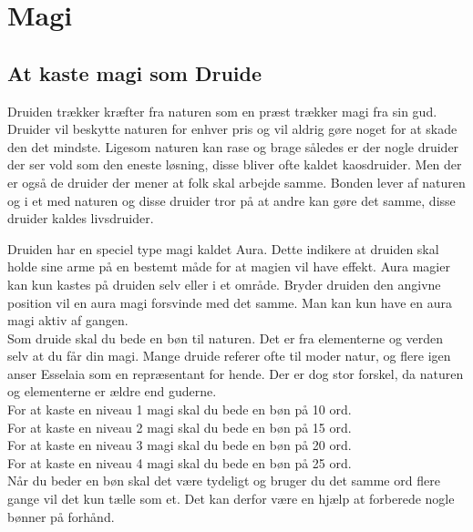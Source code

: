 \chapter{Magi}



\section{At kaste magi som Druide}

Druiden trækker kræfter fra naturen som en præst trækker magi fra sin gud. Druider vil beskytte naturen for enhver pris og vil aldrig gøre noget for at skade den det mindste. Ligesom naturen kan rase og brage således er der nogle druider der ser vold som den eneste løsning, disse bliver ofte kaldet kaosdruider. Men der er også de druider der mener at folk skal arbejde samme. Bonden lever af naturen og i et med naturen og disse druider tror på at andre kan gøre det samme, disse druider kaldes livsdruider.

Druiden har en speciel type magi kaldet Aura. Dette indikere at druiden skal holde sine arme på en bestemt måde for at magien vil have effekt. Aura magier kan kun kastes på druiden selv eller i et område. Bryder druiden den angivne position vil en aura magi forsvinde med det samme. Man kan kun have en aura magi aktiv af gangen.\\

Som druide skal du bede en bøn til naturen. Det er fra elementerne og verden selv at du får din magi. Mange druide referer ofte til moder natur, og flere igen anser Esselaia som en repræsentant for hende. Der er dog stor forskel, da naturen og elementerne er ældre end guderne.\\

For at kaste en niveau 1 magi skal du bede en bøn på 10 ord.\\
For at kaste en niveau 2 magi skal du bede en bøn på 15 ord.\\
For at kaste en niveau 3 magi skal du bede en bøn på 20 ord.\\
For at kaste en niveau 4 magi skal du bede en bøn på 25 ord.\\

Når du beder en bøn skal det være tydeligt og bruger du det samme ord flere gange vil det kun tælle som et. Det kan derfor være en hjælp at forberede nogle bønner på forhånd.

